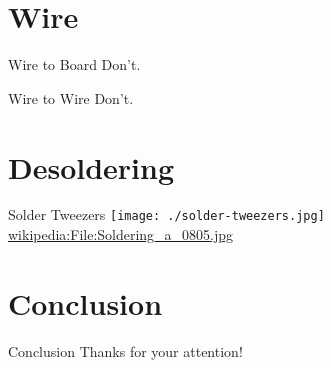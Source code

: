 \documentclass{presentation}
\begin{document}
\section{Wire}

\begin{frame}{Wire to Board}
  Don't.
\end{frame}

\begin{frame}{Wire to Wire}
  Don't.
\end{frame}

\section{Desoldering}

\begin{frame}{Solder Tweezers}
  \centering
  \texttt{[image: ./solder-tweezers.jpg]} \\
  \url{wikipedia:File:Soldering_a_0805.jpg}
\end{frame}

\section{Conclusion}

\begin{frame}{Conclusion}
  Thanks for your attention!
\end{frame}
\end{document}
